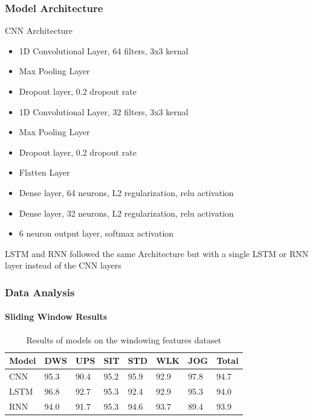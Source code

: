 \documentclass[
	11pt, %
]{beamer}
\begin{document}
\begin{frame}
    \frametitle{Model Architecture}

    \begin{block}{CNN Architecture}
        \begin{itemize}
            \item 1D Convolutional Layer, 64 filters, 3x3 kernal
            \item Max Pooling Layer
            \item Dropout layer, 0.2 dropout rate
            \item 1D Convolutional Layer, 32 filters, 3x3 kernal
            \item Max Pooling Layer
            \item Dropout layer, 0.2 dropout rate
            \item Flatten Layer
            \item Dense layer, 64 neurons, L2 regularization, relu activation
            \item Dense layer, 32 neurons, L2 regularization, relu activation
            \item 6 neuron output layer, softmax activation
        \end{itemize}
    \end{block}

    LSTM and RNN followed the same Architecture but with a single LSTM or RNN layer instead of the CNN layers

\end{frame}

\begin{frame}
    \frametitle{Data Analysis}
    \framesubtitle{Sliding Window Results}


    \begin{table}
		\begin{tabular}{l l l l l l l l}
			\toprule
			\textbf{Model} & \textbf{DWS} & \textbf{UPS} & \textbf{SIT} & \textbf{STD} & \textbf{WLK} & \textbf{JOG} & Total \\
			\midrule
			CNN & 95.3 & 90.4 & 95.2 & 95.9 & 92.9 & 97.8 & 94.7 \\
            LSTM & 96.8 & 92.7 & 95.3 & 92.4 & 92.9 & 95.3 & 94.0 \\
            RNN & 94.0 & 91.7 & 95.3 & 94.6 & 93.7 & 89.4 & 93.9 \\
			\bottomrule
		\end{tabular}
		\caption{Results of models on the windowing features dataset}
	\end{table}

\end{frame}
\end{document}
